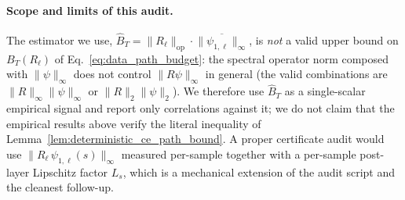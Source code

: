 \documentclass[11pt]{article}
\theoremstyle{plain}
\theoremstyle{definition}
\theoremstyle{remark}
\newcommand{\1}{\mathbf{1}}
\begin{document}
\paragraph{Scope and limits of this audit.}
The estimator we use, \(\hat B_T = \|R_\ell\|_{\mathrm{op}} \cdot \overline{\|\psi_{1,\ell}\|_\infty}\), is \emph{not} a valid upper bound on \(B_T(R_\ell)\) of Eq.~\eqref{eq:data_path_budget}: the spectral operator norm composed with \(\|\psi\|_\infty\) does not control \(\|R\psi\|_\infty\) in general (the valid combinations are \(\|R\|_\infty\|\psi\|_\infty\) or \(\|R\|_2\|\psi\|_2\)).  We therefore use \(\hat B_T\) as a single-scalar empirical signal and report only correlations against it; we do not claim that the empirical results above verify the literal inequality of Lemma~\ref{lem:deterministic_ce_path_bound}.  A proper certificate audit would use \(\|R_\ell\,\psi_{1,\ell}(s)\|_\infty\) measured per-sample together with a per-sample post-layer Lipschitz factor \(L_s\), which is a mechanical extension of the audit script and the cleanest follow-up.
\end{document}
